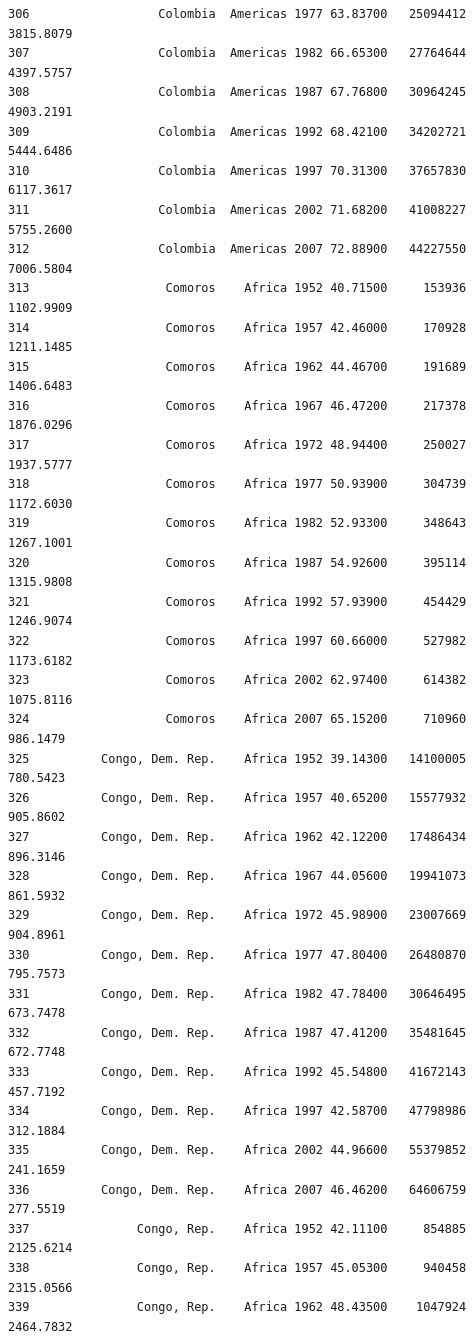 \documentclass[
  letterpaper,
  DIV=11,
  numbers=noendperiod]{scrreprt}
\begin{document}
\begin{verbatim}
306                  Colombia  Americas 1977 63.83700   25094412   3815.8079
307                  Colombia  Americas 1982 66.65300   27764644   4397.5757
308                  Colombia  Americas 1987 67.76800   30964245   4903.2191
309                  Colombia  Americas 1992 68.42100   34202721   5444.6486
310                  Colombia  Americas 1997 70.31300   37657830   6117.3617
311                  Colombia  Americas 2002 71.68200   41008227   5755.2600
312                  Colombia  Americas 2007 72.88900   44227550   7006.5804
313                   Comoros    Africa 1952 40.71500     153936   1102.9909
314                   Comoros    Africa 1957 42.46000     170928   1211.1485
315                   Comoros    Africa 1962 44.46700     191689   1406.6483
316                   Comoros    Africa 1967 46.47200     217378   1876.0296
317                   Comoros    Africa 1972 48.94400     250027   1937.5777
318                   Comoros    Africa 1977 50.93900     304739   1172.6030
319                   Comoros    Africa 1982 52.93300     348643   1267.1001
320                   Comoros    Africa 1987 54.92600     395114   1315.9808
321                   Comoros    Africa 1992 57.93900     454429   1246.9074
322                   Comoros    Africa 1997 60.66000     527982   1173.6182
323                   Comoros    Africa 2002 62.97400     614382   1075.8116
324                   Comoros    Africa 2007 65.15200     710960    986.1479
325          Congo, Dem. Rep.    Africa 1952 39.14300   14100005    780.5423
326          Congo, Dem. Rep.    Africa 1957 40.65200   15577932    905.8602
327          Congo, Dem. Rep.    Africa 1962 42.12200   17486434    896.3146
328          Congo, Dem. Rep.    Africa 1967 44.05600   19941073    861.5932
329          Congo, Dem. Rep.    Africa 1972 45.98900   23007669    904.8961
330          Congo, Dem. Rep.    Africa 1977 47.80400   26480870    795.7573
331          Congo, Dem. Rep.    Africa 1982 47.78400   30646495    673.7478
332          Congo, Dem. Rep.    Africa 1987 47.41200   35481645    672.7748
333          Congo, Dem. Rep.    Africa 1992 45.54800   41672143    457.7192
334          Congo, Dem. Rep.    Africa 1997 42.58700   47798986    312.1884
335          Congo, Dem. Rep.    Africa 2002 44.96600   55379852    241.1659
336          Congo, Dem. Rep.    Africa 2007 46.46200   64606759    277.5519
337               Congo, Rep.    Africa 1952 42.11100     854885   2125.6214
338               Congo, Rep.    Africa 1957 45.05300     940458   2315.0566
339               Congo, Rep.    Africa 1962 48.43500    1047924   2464.7832

\end{verbatim}
\end{document}
